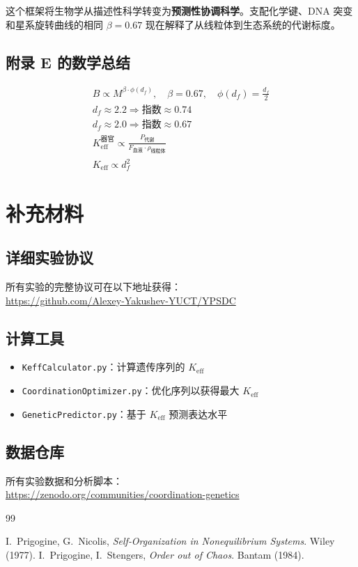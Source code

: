 \documentclass[12pt]{article}
\newcommand{\Keff}{K_{\mathrm{eff}}}
\begin{document}
	这个框架将生物学从描述性科学转变为\textbf{预测性协调科学}。支配化学键、DNA 突变和星系旋转曲线的相同 \(\beta = 0.67\) 现在解释了从线粒体到生态系统的代谢标度。
	
	\subsection{附录 E 的数学总结}
	
	\begin{align}
		\boxed{B \propto M^{\beta \cdot \phi(d_f)},\quad \beta = 0.67,\quad \phi(d_f) = \frac{d_f}{2}} \\
		\boxed{d_f \approx 2.2 \Rightarrow \text{指数} \approx 0.74} \\
		\boxed{d_f \approx 2.0 \Rightarrow \text{指数} \approx 0.67} \\
		\boxed{\Keff^{\text{器官}} \propto \frac{P_{\text{代谢}}}{F_{\text{血液}} \cdot \rho_{\text{线粒体}}}} \\
		\boxed{\Keff \propto d_f^{2}}
	\end{align}
	
	\appendix
	\section{补充材料}
	
	\subsection{详细实验协议}
	
	所有实验的完整协议可在以下地址获得：\\
	\url{https://github.com/Alexey-Yakushev-YUCT/YPSDC}
	
	\subsection{计算工具}
	
	\begin{itemize}
		\item \texttt{KeffCalculator.py}：计算遗传序列的 $K_{\text{eff}}$
		\item \texttt{CoordinationOptimizer.py}：优化序列以获得最大 $K_{\text{eff}}$
		\item \texttt{GeneticPredictor.py}：基于 $K_{\text{eff}}$ 预测表达水平
	\end{itemize}
	
	\subsection{数据仓库}
	
	所有实验数据和分析脚本：\\
	\url{https://zenodo.org/communities/coordination-genetics}
	
	\begin{thebibliography}{99}
		
		 I.~Prigogine, G.~Nicolis, \emph{Self‑Organization in Nonequilibrium Systems}. Wiley (1977).
		 I.~Prigogine, I.~Stengers, \emph{Order out of Chaos}. Bantam (1984).
		
	\end{thebibliography}
	
\end{document}
